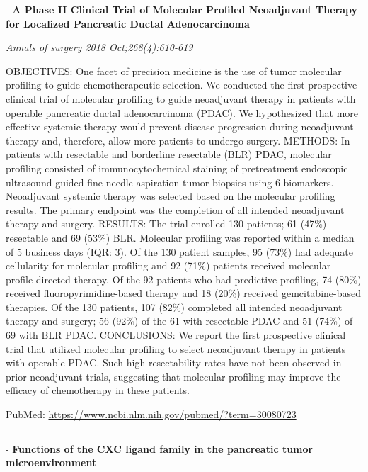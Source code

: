 \documentclass[]{article}
\begin{document}
 - \textbf{A Phase II Clinical Trial of Molecular Profiled Neoadjuvant
Therapy for Localized Pancreatic Ductal Adenocarcinoma}

\emph{Annals of surgery 2018 Oct;268(4):610-619}

OBJECTIVES: One facet of precision medicine is the use of tumor
molecular profiling to guide chemotherapeutic selection. We conducted
the first prospective clinical trial of molecular profiling to guide
neoadjuvant therapy in patients with operable pancreatic ductal
adenocarcinoma (PDAC). We hypothesized that more effective systemic
therapy would prevent disease progression during neoadjuvant therapy
and, therefore, allow more patients to undergo surgery. METHODS: In
patients with resectable and borderline resectable (BLR) PDAC, molecular
profiling consisted of immunocytochemical staining of pretreatment
endoscopic ultrasound-guided fine needle aspiration tumor biopsies using
6 biomarkers. Neoadjuvant systemic therapy was selected based on the
molecular profiling results. The primary endpoint was the completion of
all intended neoadjuvant therapy and surgery. RESULTS: The trial
enrolled 130 patients; 61 (47\%) resectable and 69 (53\%) BLR. Molecular
profiling was reported within a median of 5 business days (IQR: 3). Of
the 130 patient samples, 95 (73\%) had adequate cellularity for
molecular profiling and 92 (71\%) patients received molecular
profile-directed therapy. Of the 92 patients who had predictive
profiling, 74 (80\%) received fluoropyrimidine-based therapy and 18
(20\%) received gemcitabine-based therapies. Of the 130 patients, 107
(82\%) completed all intended neoadjuvant therapy and surgery; 56 (92\%)
of the 61 with resectable PDAC and 51 (74\%) of 69 with BLR PDAC.
CONCLUSIONS: We report the first prospective clinical trial that
utilized molecular profiling to select neoadjuvant therapy in patients
with operable PDAC. Such high resectability rates have not been observed
in prior neoadjuvant trials, suggesting that molecular profiling may
improve the efficacy of chemotherapy in these patients.

PubMed: \url{https://www.ncbi.nlm.nih.gov/pubmed/?term=30080723}

{}

{}

\begin{center}\rule{0.5\linewidth}{\linethickness}\end{center}

 - \textbf{Functions of the CXC ligand family in the pancreatic tumor
microenvironment}
\end{document}
